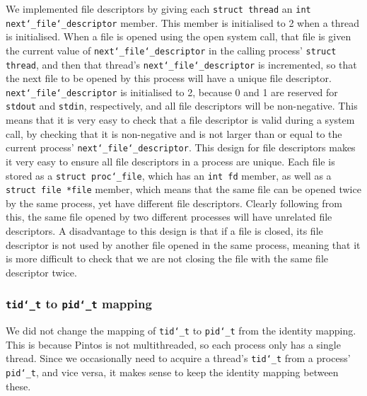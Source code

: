 \documentclass{article}
\renewcommand{\_}{\char`_}
\begin{document}
We implemented file descriptors by giving each \texttt{struct thread} an \texttt{int next\_file\_descriptor} member. This member is initialised to 2 when a thread is initialised. When a file is opened using the open system call, that file is given the current value of \texttt{next\_file\_descriptor} in the calling process' \texttt{struct thread}, and then that thread's \texttt{next\_file\_descriptor} is incremented, so that the next file to be opened by this process will have a unique file descriptor. \texttt{next\_file\_descriptor} is initialised to 2, because 0 and 1 are reserved for \texttt{stdout} and \texttt{stdin}, respectively, and all file descriptors will be non-negative. This means that it is very easy to check that a file descriptor is valid during a system call, by checking that it is non-negative and is not larger than or equal to the current process' \texttt{next\_file\_descriptor}. This design for file descriptors makes it very easy to ensure all file descriptors in a process are unique. Each file is stored as a \texttt{struct proc\_file}, which has an \texttt{int fd} member, as well as a \texttt{struct file *file} member, which means that the same file can be opened twice by the same process, yet have different file descriptors. Clearly following from this, the same file opened by two different processes will have unrelated file descriptors. A disadvantage to this design is that if a file is closed, its file descriptor is not used by another file opened in the same process, meaning that it is more difficult to check that we are not closing the file with the same file descriptor twice.

\subsubsection{\texttt{tid\_t} to \texttt{pid\_t} mapping}

We did not change the mapping of \texttt{tid\_t} to \texttt{pid\_t} from the identity mapping. This is because Pintos is not multithreaded, so each process only has a single thread. Since we occasionally need to acquire a thread's \texttt{tid\_t} from a process' \texttt{pid\_t}, and vice versa, it makes sense to keep the identity mapping between these.

\end{document}
